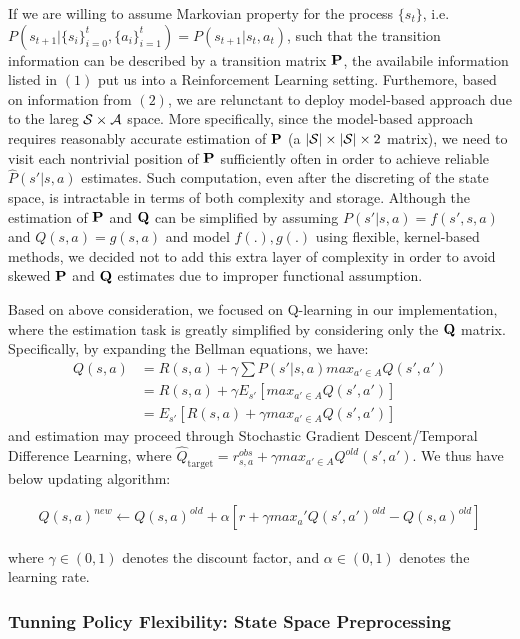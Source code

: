 \documentclass[11pt]{article}
\theoremstyle{definition}
\begin{document}
If we are willing to assume Markovian property for the process $\{s_t\}$, i.e. $P(s_{t+1} \big| \{s_i\}_{i=0}^{t}, \{a_i\}_{i=1}^{t}) = P(s_{t+1} \big| s_t, a_t) $, such that the transition information can be described by a transition matrix ${\bf P}$, the availabile information listed in $(1)$ put us into a Reinforcement Learning setting. Furthemore, based on information from $(2)$, we are relunctant to deploy model-based approach due to the lareg ${\cal S} \times {\cal A}$ space. More specifically, since the model-based approach requires reasonably accurate estimation of ${\bf P}$ (a $|{\cal S}| \times |{\cal S}| \times 2$ matrix), we need to visit each nontrivial position of ${\bf P}$  sufficiently often in order to achieve reliable $\hat{P}(s'|s, a)$ estimates. Such computation, even after the discreting of the state space, is intractable in terms of both complexity and storage. Although the estimation of ${\bf P}$ and ${\bf Q}$ can be simplified by assuming $P(s'|s, a) = f(s', s, a)$ and $Q(s, a) = g(s, a)$ and model $f(.), g(.)$ using flexible, kernel-based methods, we decided not to add this extra layer of complexity in order to avoid skewed ${\bf P}$ and ${\bf Q}$ estimates due to improper functional assumption.

Based on above consideration, we focused on Q-learning in our implementation, where the estimation task is greatly simplified by considering only the ${\bf Q}$ matrix. Specifically, by expanding the Bellman equations, we have: 
\begin{align*}
Q(s,a) &= R(s,a)+\gamma\sum P(s'|s,a) max_{a'\in A}Q(s',a')\\
&= R(s,a)+\gamma E_{s'}[max_{a'\in A}Q(s',a')]\\
&=E_{s'}[R(s,a)+\gamma max_{a'\in A}Q(s',a')]
\end{align*}
and estimation may proceed through Stochastic Gradient Descent/Temporal Difference Learning, where $\hat{Q}_{\mbox{target}} = r_{s, a}^{obs} +\gamma max_{a'\in A}Q^{old}(s',a')$. We thus have below updating algorithm:

\begin{align}
Q(s,a)^{new} \leftarrow 
Q(s,a)^{old} + \alpha [r + \gamma  max_a' Q(s',a')^{old} - Q(s,a)^{old} ]
\label{eq:update}
\end{align}

where $\gamma \in (0, 1)$ denotes the discount factor, and $\alpha \in (0, 1)$ denotes the learning rate.

\subsubsection{\textbf{Tunning Policy Flexibility: State Space Preprocessing}}
\end{document}
